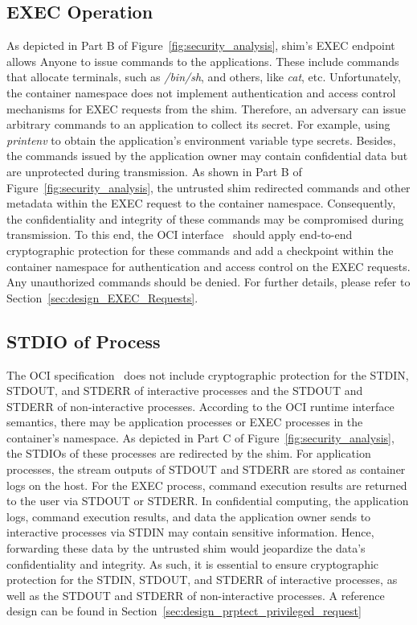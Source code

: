 \subsection{EXEC Operation}
\label{sec:Security_OCI_EXEC}

As depicted in Part B of Figure~\ref{fig:security_analysis}, shim's EXEC endpoint allows Anyone to issue commands to the applications. These include commands that allocate terminals, such as \emph{/bin/sh}, and others, like \emph{cat}, etc. Unfortunately, the container namespace does not implement authentication and access control mechanisms for EXEC requests from 
the shim. Therefore, an adversary can issue arbitrary commands to an application to collect its secret. For example, using \emph{printenv} to obtain the application's environment variable type secrets. Besides, the commands issued by the application owner may contain confidential data but are unprotected during transmission. As shown in Part B of Figure~\ref{fig:security_analysis}, the untrusted 
shim redirected commands and other metadata within the EXEC request to the container namespace. Consequently, the confidentiality and integrity of these commands may be compromised during transmission. To this end, the OCI interface~\cite*{oci-runtime-spec} should apply end-to-end cryptographic protection for these commands and add a checkpoint within the 
container namespace for authentication and access control on the EXEC requests. Any unauthorized commands should be denied. For further details, please refer to Section~\ref{sec:design_EXEC_Requests}.


\subsection{STDIO of Process}
\label{sec:security_analyse_STDIO_oci}
The OCI specification~\cite*{oci-runtime-spec} does not include cryptographic protection for the STDIN, STDOUT, and STDERR  of interactive processes and the STDOUT and STDERR of non-interactive processes. According to the OCI runtime interface semantics, there may be application processes or EXEC processes in the container's namespace. As depicted in Part C of 
Figure~\ref{fig:security_analysis}, the STDIOs of these processes are redirected by the shim. For application processes, the stream outputs of STDOUT and STDERR are stored as container logs on the host. For the EXEC process, command execution results are returned to the user via STDOUT or STDERR. In confidential computing, the application logs, command execution 
results, and data the application owner sends to interactive processes via STDIN may contain sensitive information. Hence, forwarding these data by the untrusted shim would jeopardize the data's confidentiality and integrity. As such, it is essential to ensure cryptographic protection for the STDIN, STDOUT, and STDERR of interactive processes, as well as 
the STDOUT and STDERR of non-interactive processes. A reference design can be found in Section~\ref{sec:design_prptect_privileged_request}

